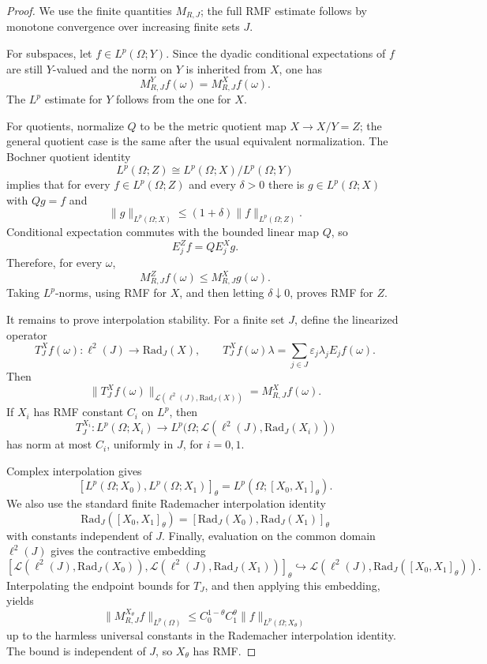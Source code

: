 \documentclass[11pt]{article}
\newcommand{\Rad}{\mathrm{Rad}}
\newcommand{\cL}{\mathcal L}
\begin{document}
\begin{proof}
We use the finite quantities \(M_{R,J}\); the full RMF estimate follows by monotone convergence over increasing finite sets \(J\).

For subspaces, let \(f\in L^p(\Omega;Y)\).  Since the dyadic conditional expectations of \(f\) are still \(Y\)-valued and the norm on \(Y\) is inherited from \(X\), one has
\[
M_{R,J}^Y f(\omega)=M_{R,J}^X f(\omega).
\]
The \(L^p\) estimate for \(Y\) follows from the one for \(X\).

For quotients, normalize \(Q\) to be the metric quotient map \(X\to X/Y=Z\); the general quotient case is the same after the usual equivalent normalization.  The Bochner quotient identity
\[
L^p(\Omega;Z) \cong L^p(\Omega;X)/L^p(\Omega;Y)
\]
implies that for every \(f\in L^p(\Omega;Z)\) and every \(\delta>0\) there is \(g\in L^p(\Omega;X)\) with \(Qg=f\) and
\[
\|g\|_{L^p(\Omega;X)}\leq (1+\delta)\|f\|_{L^p(\Omega;Z)}.
\]
Conditional expectation commutes with the bounded linear map \(Q\), so
\[
E_j^Z f = Q E_j^X g.
\]
Therefore, for every \(\omega\),
\[
M_{R,J}^Z f(\omega)
\leq
M_{R,J}^X g(\omega).
\]
Taking \(L^p\)-norms, using RMF for \(X\), and then letting \(\delta\downarrow0\), proves RMF for \(Z\).

It remains to prove interpolation stability.  For a finite set \(J\), define the linearized operator
\[
T_J^X f(\omega):\ell^2(J)\to \Rad_J(X),
\qquad
T_J^X f(\omega)\lambda
  =
  \sum_{j\in J}\varepsilon_j \lambda_j E_j f(\omega).
\]
Then
\[
\|T_J^X f(\omega)\|_{\cL(\ell^2(J),\Rad_J(X))}
  = M_{R,J}^X f(\omega).
\]
If \(X_i\) has RMF constant \(C_i\) on \(L^p\), then
\[
T_J^{X_i}:L^p(\Omega;X_i)
\longrightarrow
L^p\bigl(\Omega;\cL(\ell^2(J),\Rad_J(X_i))\bigr)
\]
has norm at most \(C_i\), uniformly in \(J\), for \(i=0,1\).

Complex interpolation gives
\[
[L^p(\Omega;X_0),L^p(\Omega;X_1)]_\theta
  =
L^p(\Omega;[X_0,X_1]_\theta).
\]
We also use the standard finite Rademacher interpolation identity
\[
\Rad_J([X_0,X_1]_\theta)
  =
[\Rad_J(X_0),\Rad_J(X_1)]_\theta
\]
with constants independent of \(J\).  Finally, evaluation on the common domain \(\ell^2(J)\) gives the contractive embedding
\[
[
\cL(\ell^2(J),\Rad_J(X_0)),
\cL(\ell^2(J),\Rad_J(X_1))
]_\theta
\hookrightarrow
\cL(\ell^2(J),\Rad_J([X_0,X_1]_\theta)).
\]
Interpolating the endpoint bounds for \(T_J\), and then applying this embedding, yields
\[
\|M_{R,J}^{X_\theta} f\|_{L^p(\Omega)}
\leq
C_0^{1-\theta}C_1^\theta
\|f\|_{L^p(\Omega;X_\theta)}
\]
up to the harmless universal constants in the Rademacher interpolation identity.  The bound is independent of \(J\), so \(X_\theta\) has RMF.
\end{proof}
\end{document}
